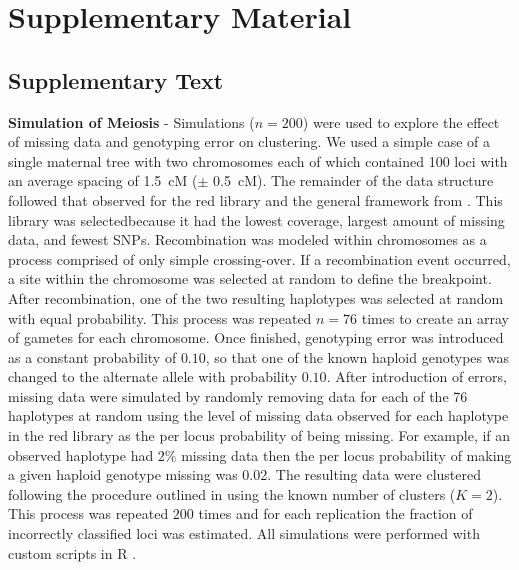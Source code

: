 \documentclass[11pt]{article}
\newcommand{\beginsupplement}{%
        \setcounter{table}{0}
        \renewcommand{\thetable}{S\arabic{table}}
        \setcounter{figure}{0}
        \renewcommand{\thefigure}{S\arabic{figure}}
        \renewcommand{\thesection}{S\arabic{section}}
        \renewcommand{\thesubsection}{S\arabic{subsection}}
     }
\begin{document}
\clearpage

\beginsupplement

\section*{Supplementary Material}

\subsection*{Supplementary Text}\label{ss:supp}

\textbf{Simulation of Meiosis} - Simulations ($n = 200$) were used to explore 
the effect of missing data and genotyping error on clustering. We 
used a simple case of a single maternal tree with two chromosomes each of which contained 100 loci
with an average spacing of \SI{1.5}{cM} ($\pm$ \SI{0.5}{cM}).
The remainder of the data structure followed that observed for the red library and the general framework from \citet{Hackett:2003}. 
This library was selectedbecause it had the lowest coverage, largest amount of missing data, and fewest SNPs.
Recombination was modeled within chromosomes as a process comprised of only simple crossing-over. If a recombination event occurred, 
a site within the chromosome was selected at random to define the breakpoint. After recombination, one of the two resulting haplotypes was
selected at random with equal probability. This process was repeated $n = 76$ times to create
an array of gametes for each chromosome. Once finished, genotyping error was introduced as a constant
probability of $0.10$, so that one of the known haploid genotypes was changed to the alternate allele with probability $0.10$. 
After introduction of errors, missing data were simulated by randomly removing data for each
of the 76 haplotypes at random using the level of missing data observed for each haplotype in the red library
as the per locus probability of being missing. For example, if an observed haplotype had $2\%$ missing data
then the per locus probability of making a given haploid genotype missing was 0.02. The resulting data were
clustered following the procedure outlined in  using the known number of clusters ($K = 2$).
This process was repeated $200$ times and for each replication the fraction of incorrectly classified loci was
estimated. All simulations were performed with custom scripts in R \citep{R:2013}.
\end{document}
